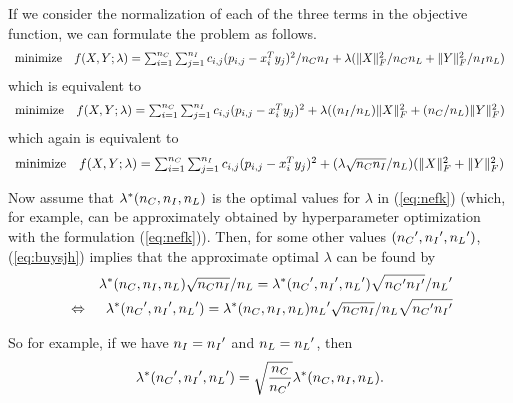 If we consider the normalization of each of the three terms in the objective function,
we can formulate the problem as follows.
\begin{equation}
\begin{array}{ll}
\mbox{minimize} &
f(X,Y; \lambda) = \sum_{i=1}^{{n_C}} \sum_{j=1}^{{n_I}} c_{i,j} (p_{i,j} - x_i^Ty_j)^2 / {{n_C}{n_I}}
+ \lambda (\|X\|_F^2/{{n_C}{n_L}} + \|Y\|_F^2/{{n_I} {n_L}})
\end{array}
\end{equation}
which is equivalent to
\begin{equation}
\begin{array}{ll}
\mbox{minimize} &
f(X,Y; \lambda) = \sum_{i=1}^{{n_C}} \sum_{j=1}^{{n_I}} c_{i,j} (p_{i,j} - x_i^Ty_j)^2
+ \lambda (({n_I}/{n_L})\|X\|_F^2 + ({n_C} / {n_L}) \|Y\|_F^2)
\end{array}
\end{equation}
which again is equivalent to
\begin{equation}
\label{eq:buysjh}
\begin{array}{ll}
\mbox{minimize} &
f(X,Y; \lambda) = \sum_{i=1}^{{n_C}} \sum_{j=1}^{{n_I}} c_{i,j} (p_{i,j} - x_i^Ty_j)^2
+ (\lambda \sqrt{{n_C} {n_I}} / {n_L}) ( \|X\|_F^2 + \|Y\|_F^2)
\end{array}
\end{equation}



Now assume that $\lambda^\ast({n_C}, {n_I}, {n_L})$
is the optimal values for $\lambda$ in (\ref{eq:nefk}) (which, for example, can be approximately obtained
by hyperparameter optimization with the formulation (\ref{eq:nefk})).
Then, for some other values $({n_C}', {n_I}', {n_L}')$,
(\ref{eq:buysjh}) implies that the approximate optimal $\lambda$ can be found by
\begin{eqnarray*}
&&
\lambda^\ast({n_C}, {n_I}, {n_L}) \sqrt{{n_C} {n_I}} / {n_L}
= \lambda^\ast({n_C}', {n_I}', {n_L}') \sqrt{{n_C}' {n_I}'} / {n_L}'
\\
&\Leftrightarrow&
\lambda^\ast({n_C}', {n_I}', {n_L}')
= \lambda^\ast({n_C}, {n_I}, {n_L}) {n_L}' \sqrt{{n_C} {n_I}} / {n_L}\sqrt{{n_C}' {n_I}'} 
\end{eqnarray*}

So for example, if we have ${n_I} = {n_I}'$ and ${n_L} = {n_L}'$,
then
\begin{equation}
\lambda^\ast({n_C}', {n_I}', {n_L}')
= \sqrt{\frac{{n_C}}{{n_C}'}} \lambda^\ast({n_C}, {n_I}, {n_L}).
\end{equation}







